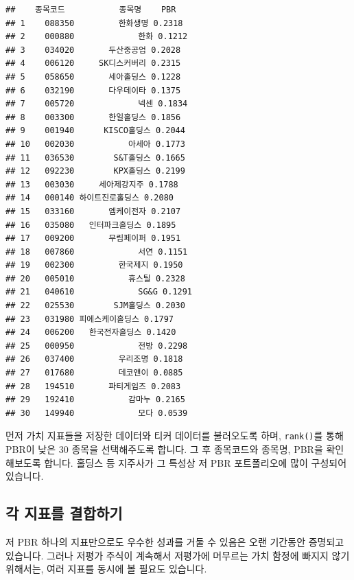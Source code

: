 \documentclass[12pt,]{book}
\begin{document}
\begin{verbatim}
##    종목코드           종목명    PBR
## 1    088350         한화생명 0.2318
## 2    000880             한화 0.1212
## 3    034020       두산중공업 0.2028
## 4    006120     SK디스커버리 0.2315
## 5    058650       세아홀딩스 0.1228
## 6    032190       다우데이타 0.1375
## 7    005720             넥센 0.1834
## 8    003300       한일홀딩스 0.1856
## 9    001940      KISCO홀딩스 0.2044
## 10   002030           아세아 0.1773
## 11   036530        S&T홀딩스 0.1665
## 12   092230        KPX홀딩스 0.2199
## 13   003030     세아제강지주 0.1788
## 14   000140 하이트진로홀딩스 0.2080
## 15   033160       엠케이전자 0.2107
## 16   035080   인터파크홀딩스 0.1895
## 17   009200       무림페이퍼 0.1951
## 18   007860             서연 0.1151
## 19   002300         한국제지 0.1950
## 20   005010           휴스틸 0.2328
## 21   040610             SG&G 0.1291
## 22   025530        SJM홀딩스 0.2030
## 23   031980 피에스케이홀딩스 0.1797
## 24   006200   한국전자홀딩스 0.1420
## 25   000950             전방 0.2298
## 26   037400         우리조명 0.1818
## 27   017680         데코앤이 0.0885
## 28   194510       파티게임즈 0.2083
## 29   192410           감마누 0.2165
## 30   149940             모다 0.0539
\end{verbatim}

먼저 가치 지표들을 저장한 데이터와 티커 데이터를 불러오도록 하며, \texttt{rank()}를 통해 PBR이 낮은 30 종목을 선택해주도록 합니다. 그 후 종목코드와 종목명, PBR을 확인해보도록 합니다. 홀딩스 등 지주사가 그 특성상 저 PBR 포트폴리오에 많이 구성되어 있습니다.

\hypertarget{section-56}{%
\subsection{각 지표를 결합하기}\label{section-56}}

저 PBR 하나의 지표만으로도 우수한 성과를 거둘 수 있음은 오랜 기간동안 증명되고 있습니다. 그러나 저평가 주식이 계속해서 저평가에 머무르는 가치 함정에 빠지지 않기 위해서는, 여러 지표를 동시에 볼 필요도 있습니다.
\end{document}
